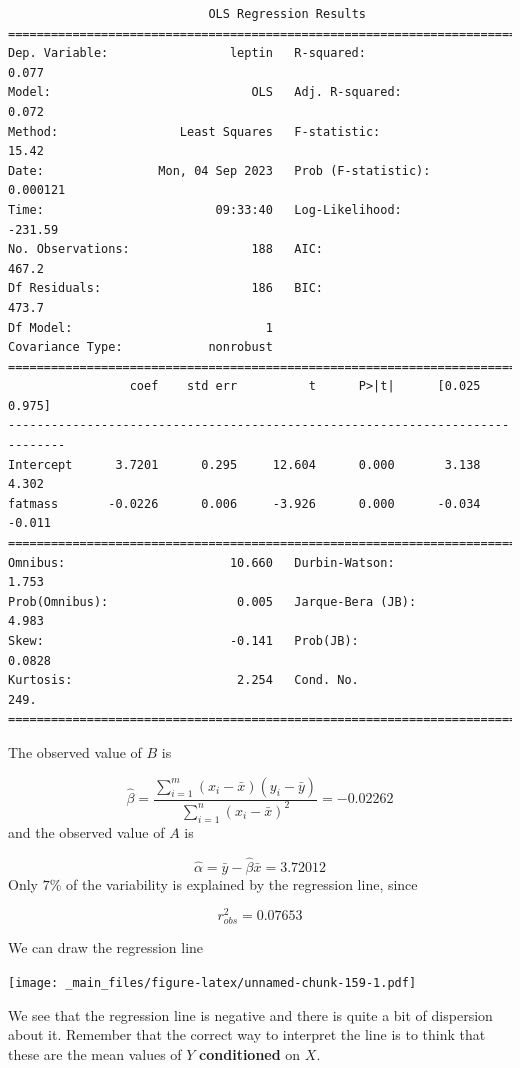 \documentclass[
]{book}
\begin{document}
\begin{verbatim}
                            OLS Regression Results                            
==============================================================================
Dep. Variable:                 leptin   R-squared:                       0.077
Model:                            OLS   Adj. R-squared:                  0.072
Method:                 Least Squares   F-statistic:                     15.42
Date:                Mon, 04 Sep 2023   Prob (F-statistic):           0.000121
Time:                        09:33:40   Log-Likelihood:                -231.59
No. Observations:                 188   AIC:                             467.2
Df Residuals:                     186   BIC:                             473.7
Df Model:                           1                                         
Covariance Type:            nonrobust                                         
==============================================================================
                 coef    std err          t      P>|t|      [0.025      0.975]
------------------------------------------------------------------------------
Intercept      3.7201      0.295     12.604      0.000       3.138       4.302
fatmass       -0.0226      0.006     -3.926      0.000      -0.034      -0.011
==============================================================================
Omnibus:                       10.660   Durbin-Watson:                   1.753
Prob(Omnibus):                  0.005   Jarque-Bera (JB):                4.983
Skew:                          -0.141   Prob(JB):                       0.0828
Kurtosis:                       2.254   Cond. No.                         249.
==============================================================================

\end{verbatim}

The observed value of \(B\) is

\[\hat{\beta}= \frac{\sum_{i=1}^m(x_i-\bar{x})(y_i-\bar{y})}{\sum_{i=1}^n(x_i-\bar{x})^2}= -0.02262\]
and the observed value of \(A\) is

\[\hat{\alpha}=\bar{y}-\hat{\beta}\bar{x}= 3.72012\]
Only \(7\%\) of the variability is explained by the regression line, since

\[r_{obs}^2=0.07653\]

We can draw the regression line

\texttt{[image: \_main\_files/figure-latex/unnamed-chunk-159-1.pdf]}

We see that the regression line is negative and there is quite a bit of dispersion about it. Remember that the correct way to interpret the line is to think that these are the mean values of \(Y\) \textbf{conditioned} on \(X\).
\end{document}
